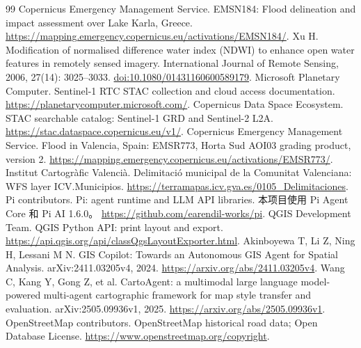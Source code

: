 \documentclass[UTF8,a4paper,zihao=-4,fontset=none]{ctexart}
\begin{document}
\clearpage
{}
{}
{\fontsize{11pt}{16pt}\selectfont
\raggedright
\begin{thebibliography}{99}
Copernicus Emergency Management Service. EMSN184: Flood delineation and impact assessment over Lake Karla, Greece.
\url{https://mapping.emergency.copernicus.eu/activations/EMSN184/}.
Xu H. Modification of normalised difference water index (NDWI) to enhance open water features in remotely sensed imagery. International Journal of Remote Sensing, 2006, 27(14): 3025--3033.
\href{https://doi.org/10.1080/01431160600589179}{doi:10.1080/01431160600589179}.
Microsoft Planetary Computer. Sentinel-1 RTC STAC collection and cloud access documentation.
\url{https://planetarycomputer.microsoft.com/}.
Copernicus Data Space Ecosystem. STAC searchable catalog: Sentinel-1 GRD and Sentinel-2 L2A.
\url{https://stac.dataspace.copernicus.eu/v1/}.
Copernicus Emergency Management Service. Flood in Valencia, Spain: EMSR773, Horta Sud AOI03 grading product, version 2.
\url{https://mapping.emergency.copernicus.eu/activations/EMSR773/}.
Institut Cartogràfic Valencià. Delimitació municipal de la Comunitat Valenciana: WFS layer ICV.Municipios.
\url{https://terramapas.icv.gva.es/0105_Delimitaciones}.
Pi contributors. Pi: agent runtime and LLM API libraries. 本项目使用 Pi Agent Core 和 Pi AI 1.6.0。
\url{https://github.com/earendil-works/pi}.
QGIS Development Team. QGIS Python API: print layout and export.
\url{https://api.qgis.org/api/classQgsLayoutExporter.html}.
Akinboyewa T, Li Z, Ning H, Lessani M N.
GIS Copilot: Towards an Autonomous GIS Agent for Spatial Analysis.
arXiv:2411.03205v4, 2024.
\url{https://arxiv.org/abs/2411.03205v4}.
Wang C, Kang Y, Gong Z, et al.
CartoAgent: a multimodal large language model-powered multi-agent cartographic framework for map style transfer and evaluation.
arXiv:2505.09936v1, 2025.
\url{https://arxiv.org/abs/2505.09936v1}.
OpenStreetMap contributors. OpenStreetMap historical road data; Open Database License.
\url{https://www.openstreetmap.org/copyright}.
\end{thebibliography}
}
\end{document}
